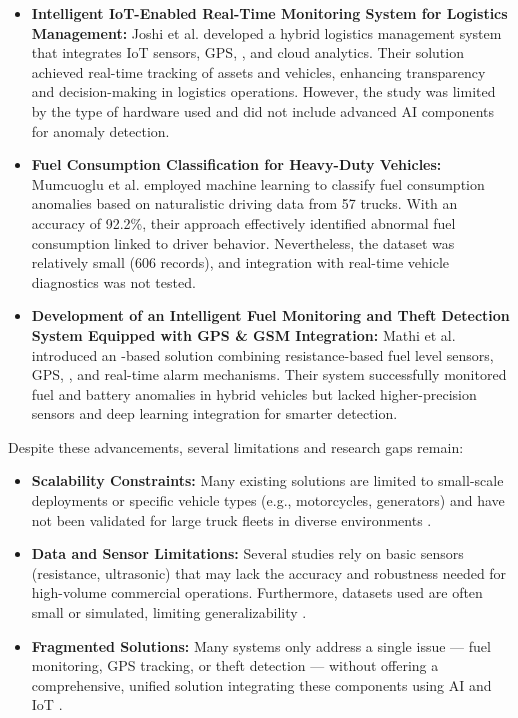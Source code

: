 \begin{itemize}
    \item \textbf{Intelligent IoT-Enabled Real-Time Monitoring System for Logistics Management:} Joshi et al. \cite{joshi2024intelligent} developed a hybrid logistics management system that integrates IoT sensors, GPS, , and \gls{cloud analytics}. Their solution achieved real-time tracking of assets and vehicles, enhancing transparency and decision-making in logistics operations. However, the study was limited by the type of hardware used and did not include advanced AI components for anomaly detection.
    
    \item \textbf{Fuel Consumption Classification for Heavy-Duty Vehicles:} Mumcuoglu et al. \cite{mumcuoglu2023fuel} employed machine learning to classify fuel consumption anomalies based on naturalistic driving data from 57 trucks. With an accuracy of 92.2\%, their approach effectively identified abnormal fuel consumption linked to driver behavior. Nevertheless, the dataset was relatively small (606 records), and integration with real-time vehicle diagnostics was not tested.
    
    \item \textbf{Development of an Intelligent Fuel Monitoring and Theft Detection System Equipped with GPS \& GSM Integration:} Mathi et al. \cite{mathi2024development} introduced an -based solution combining resistance-based fuel level sensors, GPS, , and real-time alarm mechanisms. Their system successfully monitored fuel and battery anomalies in hybrid vehicles but lacked higher-precision sensors and \gls{deep learning} integration for smarter detection.
\end{itemize}


\noindent Despite these advancements, several limitations and research gaps remain:

\begin{itemize}
    \item \textbf{Scalability Constraints:} Many existing solutions are limited to small-scale deployments or specific vehicle types (e.g., motorcycles, generators) and have not been validated for large truck fleets in diverse environments \cite{rs2024fuel, tatababu2024smart}.
    
    \item \textbf{Data and Sensor Limitations:} Several studies rely on basic sensors (resistance, ultrasonic) that may lack the accuracy and robustness needed for high-volume commercial operations. Furthermore, datasets used are often small or simulated, limiting generalizability \cite{nada2017design, krishnasamy2019}.
    
    \item \textbf{Fragmented Solutions:} Many systems only address a single issue — fuel monitoring, GPS tracking, or theft detection — without offering a comprehensive, unified solution integrating these components using AI and IoT \cite{g2022real, crisgar2021gps}.
\end{itemize}


